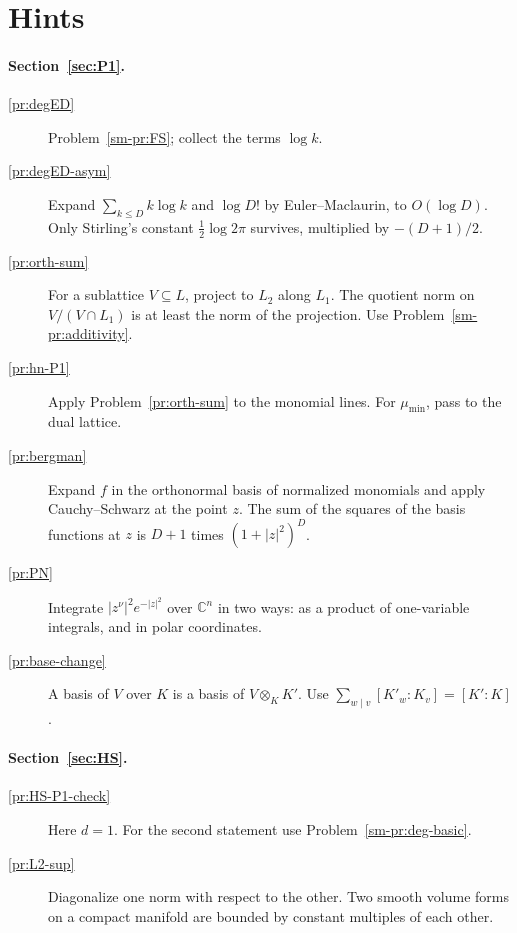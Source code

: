 \documentclass[reqno]{amsart}
\theoremstyle{definition}
\theoremstyle{plain}
\newcommand{\C}{\mathbb{C}}
\newcommand{\mumin}{\mu_{\min}}
\begin{document}
\section*{Hints}
\paragraph{Section~\ref{sec:P1}.}
\begin{description}
\item[\ref{pr:degED}] Problem~\ref{sm-pr:FS}; collect the terms \(\log k\).
\item[\ref{pr:degED-asym}] Expand \(\sum_{k \le D} k\log k\) and \(\log D!\) by Euler--Maclaurin, to \(O(\log D)\).  Only Stirling's constant \(\tfrac12\log 2\pi\) survives, multiplied by \(-(D+1)/2\).
\item[\ref{pr:orth-sum}] For a sublattice \(V \subseteq L\), project to \(L_2\) along \(L_1\).  The quotient norm on \(V/(V \cap L_1)\) is at least the norm of the projection.  Use Problem~\ref{sm-pr:additivity}.
\item[\ref{pr:hn-P1}] Apply Problem~\ref{pr:orth-sum} to the monomial lines.  For \(\mumin\), pass to the dual lattice.
\item[\ref{pr:bergman}] Expand \(f\) in the orthonormal basis of normalized monomials and apply Cauchy--Schwarz at the point \(z\).  The sum of the squares of the basis functions at \(z\) is \(D+1\) times \((1 + \lvert z \rvert^2)^D\).
\item[\ref{pr:PN}] Integrate \(\lvert z^\nu \rvert^2 e^{-\lvert z \rvert^2}\) over \(\C^n\) in two ways: as a product of one-variable integrals, and in polar coordinates.
\item[\ref{pr:base-change}] A basis of \(V\) over \(K\) is a basis of \(V \otimes_K K'\).  Use \(\sum_{w \mid v} [K'_w : K_v] = [K':K]\).
\end{description}
\paragraph{Section~\ref{sec:HS}.}
\begin{description}
\item[\ref{pr:HS-P1-check}] Here \(d = 1\).  For the second statement use Problem~\ref{sm-pr:deg-basic}.
\item[\ref{pr:L2-sup}] Diagonalize one norm with respect to the other.  Two smooth volume forms on a compact manifold are bounded by constant multiples of each other.
\end{description}
\end{document}
